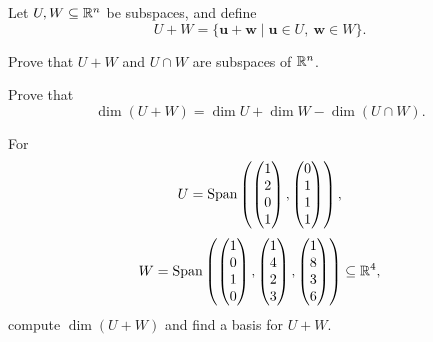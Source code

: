 \documentclass[11pt,oneside]{article}
\begin{document}
\begin{problem}
Let $U,W\subseteq\mathbb{R}^n$ be subspaces, and define
\[
U+W=\{\mathbf u+\mathbf w\mid \mathbf u\in U,\ \mathbf w\in W\}.
\]
\begin{problemsubparts}
\item Prove that $U+W$ and $U\cap W$ are subspaces of $\mathbb{R}^n$.
\item Prove that
\[
\dim(U+W)=\dim U+\dim W-\dim(U\cap W).
\]
\item For
\[
U=\operatorname{Span}\left(
\begin{pmatrix}1\\2\\0\\1\end{pmatrix},
\begin{pmatrix}0\\1\\1\\1\end{pmatrix}
\right),
\]
\[
W=\operatorname{Span}\left(
\begin{pmatrix}1\\0\\1\\0\end{pmatrix},
\begin{pmatrix}1\\4\\2\\3\end{pmatrix},
\begin{pmatrix}1\\8\\3\\6\end{pmatrix}
\right)\subseteq\mathbb{R}^4,
\]
compute $\dim(U+W)$ and find a basis for $U+W$.
\end{problemsubparts}
\end{problem}
\end{document}
